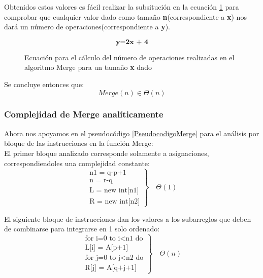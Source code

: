     Obtenidos estos valores es fácil realizar la subsitución en la ecuación \ref{EcuacionLinealMerge} para comprobar que cualquier valor dado como tamaño \textbf{n}(correspondiente a \textbf{x}) nos dará un número de operaciones(correspondiente a \textbf{y}).
    \begin{figure}[h!]
        \centering
        \begin{equation*}
           \textbf{y=2x + 4}
        \end{equation*}
        \caption{Ecuación para el cálculo del número de operaciones realizadas en el algoritmo Merge para un tamaño \textbf{x} dado}
        \label{EcuacionLinealMerge}
    \end{figure}
    
    Se concluye entonces que:
    \begin{equation*}
        Merge(n) \in \Theta(n)
    \end{equation*}
    \newpage
    
    
    
    
    
    
    
    \subsubsection*{Complejidad de \textbf{Merge} analíticamente}
    
    Ahora nos apoyamos en el pseudocódigo \ref{PseudocodigoMerge} para el análisis por bloque de las instrucciones en la función Merge: \\
    
    El primer bloque analizado corresponde solamente a asignaciones, correspondiendoles una complejidad constante:
    \begin{equation*}
        \left.
            \begin{aligned}
                \text{n1 = q-p+1} \\
                \text{n = r-q} \\
                \text{L = new int[n1]} \\
                \text{R = new int[n2]}
            \end{aligned}
        \right\}
        \quad\Theta(1)
    \end{equation*}
    
    El siguiente bloque de instrucciones dan los valores a los subarreglos que deben de combinarse para integrarse en 1 solo ordenado:
    \begin{equation*}
        \left.
            \begin{aligned}
                \text{for i=0 to i}<\text{n1 do} \\
                \text{L[i] = A[p+1]} \\
                \text{for j=0 to j}<\text{n2 do}\\
                \text{R[j] = A[q+j+1]}
            \end{aligned}
        \right\}
        \quad\Theta(n)
    \end{equation*}
    
